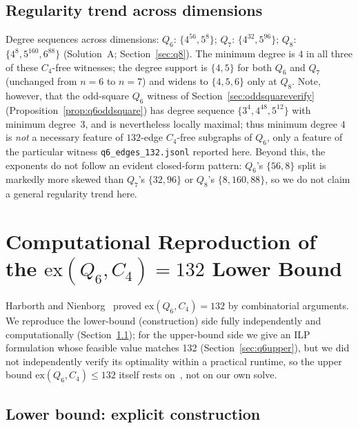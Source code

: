 \documentclass[12pt,a4paper]{article}
\theoremstyle{definition}
\newcommand{\ex}{\mathrm{ex}}
\begin{document}
\subsection{Regularity trend across dimensions}\label{sec:regularity}

Degree sequences across dimensions: $Q_6$: $\{4^{56},5^{8}\}$;
$Q_7$: $\{4^{32},5^{96}\}$; $Q_8$: $\{4^8,5^{160},6^{88}\}$ (Solution~A;
Section~\ref{sec:q8}). The minimum degree is $4$ in all three of these
$C_4$-free witnesses; the
degree support is $\{4,5\}$ for both $Q_6$ and $Q_7$ (unchanged from
$n=6$ to $n=7$) and widens to $\{4,5,6\}$ only at $Q_8$. Note, however,
that the odd-square $Q_6$ witness of
Section~\ref{sec:oddsquareverify} (Proposition~\ref{prop:q6oddsquare})
has degree sequence $\{3^4,4^{48},5^{12}\}$ with minimum degree~$3$,
and is nevertheless locally maximal; thus minimum degree $4$ is
\emph{not} a necessary feature of $132$-edge $C_4$-free subgraphs of
$Q_6$, only a feature of the particular witness
\texttt{q6\_edges\_132.jsonl} reported here. Beyond this, the
exponents do not follow an evident closed-form pattern: $Q_6$'s
$\{56,8\}$ split is markedly more skewed than $Q_7$'s $\{32,96\}$ or
$Q_8$'s $\{8,160,88\}$, so we do not claim a general regularity trend
here.

\section{Computational Reproduction of the \texorpdfstring{$\ex(Q_6,C_4)=132$}{ex(Q6,C4)=132} Lower Bound}\label{sec:q6}

Harborth and Nienborg~\cite{HN94} proved $\ex(Q_6,C_4)=132$ by combinatorial
arguments. We reproduce the lower-bound (construction) side fully
independently and computationally (Section~\ref{sec:q6lower}); for the
upper-bound side we give an ILP formulation whose feasible value matches
132 (Section~\ref{sec:q6upper}), but we did not independently verify
its optimality within a practical runtime, so the upper bound
$\ex(Q_6,C_4)\le132$ itself rests on~\cite{HN94}, not on our own solve.

\subsection{Lower bound: explicit construction}\label{sec:q6lower}
\end{document}
